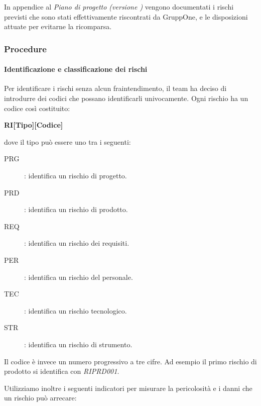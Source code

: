 \documentclass[../../norme-di-progetto.tex]{subfiles}
\begin{document}
In appendice al \textit{Piano di progetto (versione \versione)} vengono documentati i rischi previsti che sono stati effettivamente riscontrati da GruppOne, e le disposizioni attuate per evitarne la ricomparsa.


\subsubsection{Procedure}%
\label{subs:gestione_dei_rischi/procedure}

\paragraph{Identificazione e classificazione dei rischi}%
\label{par:identificazione_e_classificazione_dei_rischi}

Per identificare i rischi senza alcun fraintendimento, il team ha deciso di introdurre dei codici che possano identificarli univocamente.
Ogni rischio ha un codice così costituito:

\begin{center}
  \textbf{RI[Tipo][Codice]}
\end{center}
dove il tipo può essere uno tra i seguenti:
\begin{description}
  \item [PRG]: identifica un rischio di progetto.
  \item [PRD]: identifica un rischio di prodotto.
  \item [REQ]: identifica un rischio dei requisiti.
  \item [PER]: identifica un rischio del personale.
  \item [TEC]: identifica un rischio tecnologico.
  \item [STR]: identifica un rischio di strumento.
\end{description}
Il codice è invece un numero progressivo a tre cifre. Ad esempio il primo rischio di prodotto si identifica con \textit{RIPRD001}.

Utilizziamo inoltre i seguenti indicatori per misurare la pericolosità e i danni che un rischio può arrecare:
\end{document}

